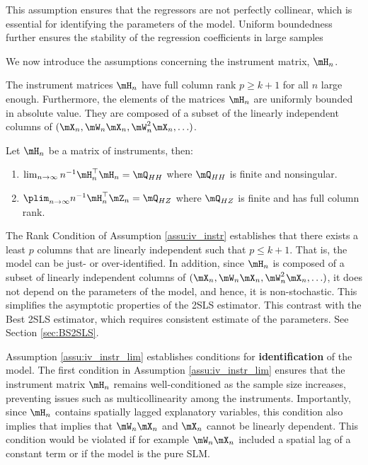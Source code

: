 \documentclass[english,12pt]{book}\usepackage[]{graphicx}\usepackage[]{xcolor}
\begin{document}
This assumption ensures that the regressors are not perfectly collinear, which is essential for identifying the parameters of the model. Uniform boundedness further ensures the stability of the regression coefficients in large samples

We now introduce the assumptions concerning the instrument matrix, $\mH_n$.

\begin{assumption}\label{assu:iv_instr}
The instrument matrices $\mH_n$ have full column rank $p \geq k + 1$ for all $n$ large enough. Furthermore, the elements of the matrices $\mH_n$ are uniformly bounded in absolute value. They are composed of a subset of the linearly independent columns of $(\mX_n, \mW_n\mX_n, \mW^2_n\mX_n, \ldots)$.
\end{assumption}


\begin{assumption}\label{assu:iv_instr_lim}
Let $\mH_n$ be a matrix of instruments, then:
\begin{enumerate}
  \item $\lim_{n\to \infty} n^{-1}\mH_n^\top\mH_n = \mQ_{HH}$ where $\mQ_{HH}$ is finite and nonsingular. 
  \item $\plim_{n\to \infty} n^{-1}\mH_n^\top\mZ_n = \mQ_{HZ}$ where $\mQ_{HZ}$ is finite and has full column rank.
\end{enumerate}
\end{assumption}

The Rank Condition of Assumption \ref{assu:iv_instr} establishes that there exists a least $p$ columns that are linearly independent such that $p \leq k + 1$. That is, the model can be just- or over-identified. In addition, since $\mH_n$ is composed of a subset of linearly independent columns of $(\mX_n, \mW_n\mX_n, \mW^2_n\mX_n, \ldots)$, it does not depend on the parameters of the model, and hence, it is non-stochastic. This simplifies the asymptotic properties of the 2SLS estimator. This contrast with the Best 2SLS estimator, which requires consistent estimate of the parameters. See Section \ref{sec:BS2SLS}.   

Assumption \ref{assu:iv_instr_lim} establishes conditions for \textbf{identification} of the model. The first condition in Assumption \ref{assu:iv_instr_lim} ensures that the instrument matrix $\mH_n$ remains well-conditioned as the sample size increases, preventing issues such as multicollinearity among the instruments. Importantly, since $\mH_n$ contains spatially lagged explanatory variables, this condition also implies that implies that $\mW_n\mX_n$ and $\mX_n$ cannot be linearly dependent. This condition would be violated if for example $\mW_n\mX_n$ included a spatial lag of a constant term or if the model is the pure SLM.  
\end{document}

